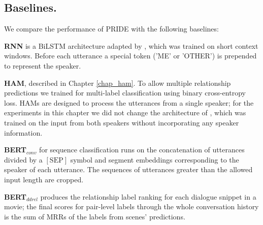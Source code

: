 \subsection{Baselines.}
 We compare the performance of PRIDE with the following baselines:
 \squishlist
     \item \textbf{RNN} is a BiLSTM \cite{graves2005framewise} architecture adapted by \citet{welch2019look}, which was trained on short context windows. Before each utterance a special token ('\textlangle ME\textrangle' or '\textlangle OTHER\textrangle') is prepended to represent the speaker.
     \item \textbf{HAM}, described in Chapter \ref{chap_ham}. To allow multiple relationship predictions we trained  for multi-label classification using binary cross-entropy loss. HAMs are designed to process the utterances from a single speaker; for the experiments in this chapter we did not change the architecture of , which was trained on the input from both speakers without incorporating any speaker information.
     \item \textbf{BERT$_{conv}$} for sequence classification \cite{lu2020improving} runs on the concatenation of utterances divided by a $[\textrm{SEP}]$ symbol and segment embeddings corresponding to the speaker of each utterance. The sequences of utterances greater than the allowed input length are cropped.
     \item \textbf{BERT$_{ddrel}$} 
     \cite{jia2020ddrel} 
     produces the relationship label ranking for each dialogue snippet in a movie; the final scores for pair-level labels through the whole conversation history is the sum of MRRs of the labels from scenes' predictions.
 \squishend